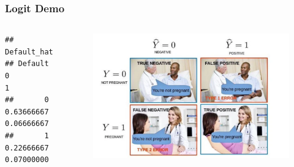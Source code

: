 \documentclass[
  shownotes,
  xcolor={svgnames},
  hyperref={colorlinks,citecolor=DarkBlue,linkcolor=DarkRed,urlcolor=DarkBlue}
  , aspectratio=169]{beamer}
\newenvironment{Shaded}{\begin{snugshade}}{\end{snugshade}}
\newcommand{\DataTypeTok}[1]{\textcolor[rgb]{0.13,0.29,0.53}{#1}}
\newcommand{\DecValTok}[1]{\textcolor[rgb]{0.00,0.00,0.81}{#1}}
\newcommand{\KeywordTok}[1]{\textcolor[rgb]{0.13,0.29,0.53}{\textbf{#1}}}
\newcommand{\NormalTok}[1]{#1}
\newcommand{\OperatorTok}[1]{\textcolor[rgb]{0.81,0.36,0.00}{\textbf{#1}}}
\newcommand{\StringTok}[1]{\textcolor[rgb]{0.31,0.60,0.02}{#1}}
\begin{document}
\begin{frame}[fragile]
\frametitle{Logit Demo}

\begin{scriptsize}
\begin{Shaded}
\end{Shaded}

\end{scriptsize}

\begin{columns}[T] %
\begin{column}{.42\textwidth}
  

\begin{scriptsize}
\begin{verbatim}
##        Default_hat
## Default          0          1
##       0 0.63666667 0.06666667
##       1 0.22666667 0.07000000
\end{verbatim}
\end{scriptsize}

\end{column}  
\hfill
\begin{column}{.48\textwidth}

 \begin{figure}[H] \centering
            \captionsetup{justification=centering}
              \includegraphics[scale=0.3]{figures/confusion_matrix}                           
 \end{figure}

\end{column}
\end{columns}

\end{frame}
\end{document}
